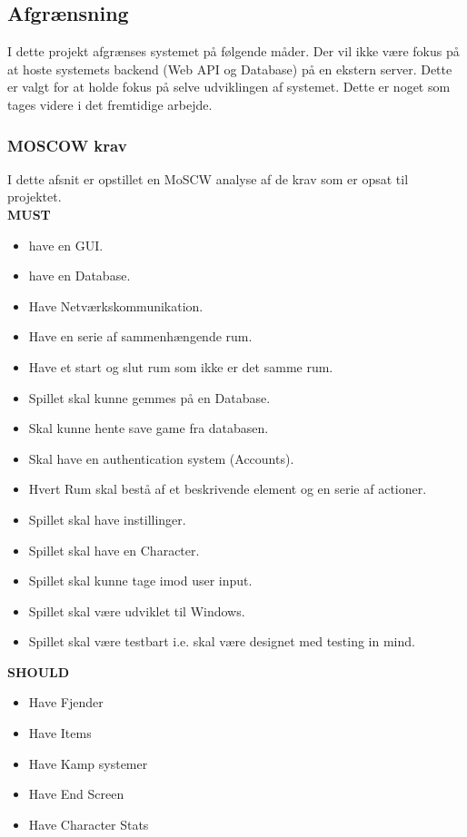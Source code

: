 \newpage
    

\subsection{Afgrænsning}
I dette projekt afgrænses systemet på følgende måder. Der vil ikke være fokus på at hoste systemets backend (Web API og Database) på en ekstern server. Dette er valgt for at holde fokus på selve udviklingen af systemet. Dette er noget som tages videre i det fremtidige arbejde.  

\subsubsection{MOSCOW krav}
\label{sssec:MOSCOW}
I dette afsnit er opstillet en MoSCW analyse af de krav som er opsat til projektet.\\

\textbf{MUST}
\begin{itemize}

\item have en GUI.
\item have en Database.
\item Have Netværkskommunikation.
\item Have en serie af sammenhængende rum.
\item Have et start og slut rum som ikke er det samme rum.
\item Spillet skal kunne gemmes på en Database.
\item Skal kunne hente save game fra databasen.
\item Skal have en authentication system (Accounts).
\item Hvert Rum skal bestå af et beskrivende element og en serie af actioner.
\item Spillet skal have instillinger.
\item Spillet skal have en Character.
\item Spillet skal kunne tage imod user input.
\item Spillet skal være udviklet til Windows.
\item Spillet skal være testbart i.e. skal være designet med testing in mind.

\end{itemize}


\textbf{SHOULD}
\begin{itemize}

\item Have Fjender
\item Have Items
\item Have Kamp systemer
\item Have End Screen
\item Have Character Stats
 
\end{itemize}

